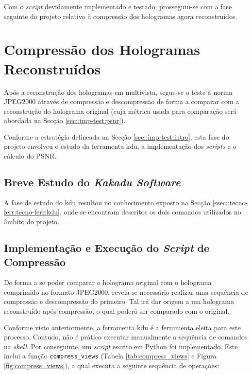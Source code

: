 Com o \textit{script} devidamente implementado e testado, prosseguiu-se com a fase seguinte do projeto relativo à compressão dos hologramas agora reconstruídos.


\section{Compressão dos Hologramas Reconstruídos}
\label{sec::imp-test:holo-compress}

Após a reconstrução dos hologramas em multivista, segue-se o teste à norma JPEG2000 através de compressão e descompressão de forma a comparar com a reconstrução do holograma original (cuja métrica usada para comparação será abordada na Secção \ref{sec::imp-test:psnr}).

Conforme a estratégia delineada na Secção \ref{sec::imp-test:intro}, esta fase do projeto envolveu o estudo da ferramenta \ac{kdu}, a implementação dos \textit{scripts} e o cálculo do \ac{PSNR}.

\subsection{Breve Estudo do \textit{Kakadu Software}}
\label{ssec::imp-test:holo-compress:estudo-kdu}

A fase de estudo do \ac{kdu} resultou no conhecimento exposto na Secção \ref{ssec::tecno-ferr:tecno-ferr:kdu}, onde se encontram descritos os dois comandos utilizados no âmbito do projeto.


\subsection{Implementação e Execução do \textit{Script} de Compressão}
\label{ssec::imp-tes:holo-compress:script}

De forma a se poder comparar o holograma original com o holograma comprimido no formato JPEG2000, revela-se necessário realizar uma sequência de compressão e descompressão do primeiro. Tal irá dar origem a um holograma reconstruido após compressão, o qual poderá ser comparado com o original.

Conforme visto anteriormente, a ferramenta \ac{kdu} é a ferramenta eleita para este processo. Contudo, não é prático executar manualmente a sequência de comandos na \textit{shell}. Por conseguinte, um \textit{script} escrito em Python foi implementado. Este inclui a função \verb|compress_views| (Tabela \ref{tab:compress_views} e Figura \ref{fig:compress_views}), a qual executa a seguinte sequência de operações:

